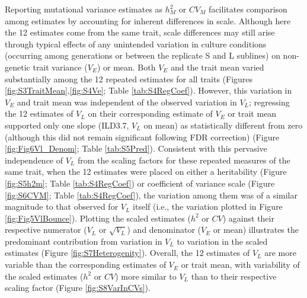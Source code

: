 Reporting mutational variance estimates as $h_M^2$ or $CV_M$ facilitates comparison among estimates by accounting for inherent differences in scale. Although here the 12 estimates come from the same trait, scale differences may still arise through typical effects of any unintended variation in culture conditions (occurring among generations or between the replicate S and L sublines) on non-genetic trait variance ($V_E$) or mean. Both $V_E$ and the trait mean varied substantially among the 12 repeated estimates for all traits (Figures \ref{fig:S3TraitMean},\ref{fig:S4Ve}; Table \ref{tab:S4RegCoef}). However, this variation in $V_E$ and trait mean was independent of the observed variation in $V_L$; regressing the 12 estimates of $V_L$ on their corresponding estimate of $V_E$ or trait mean supported only one slope (ILD3.7, $V_L$ on mean) as statistically different from zero (although this did not remain significant following FDR correction) (Figure \ref{fig:Fig6Vl_Denom}; Table \ref{tab:S5Pred}). Consistent with this pervasive independence of $V_L$ from the scaling factors for these repeated measures of the same trait, when the 12 estimates were placed on either a heritability (Figure \ref{fig:S5h2m}; Table \ref{tab:S4RegCoef}) or coefficient of variance scale (Figure \ref{fig:S6CVM}; Table \ref{tab:S4RegCoef}), the variation among them was of a similar magnitude to that observed for $V_L$ itself (i.e., the variation plotted in Figure \ref{fig:Fig5VlBounce}). Plotting the scaled estimates ($h^2$ or $CV$) against their respective numerator ($V_L$ or $\sqrt{V_L}$) and denominator ($V_E$ or mean) illustrates the predominant contribution from variation in $V_L$ to variation in the scaled estimates (Figure \ref{fig:S7Heterogenity}). Overall, the 12 estimates of $V_L$ are more variable than the corresponding estimates of $V_E$ or trait mean, with variability of the scaled estimates ($h^2$ or $CV$) more similar to $V_L$ than to their respective scaling factor (Figure \ref{fig:S8VarInCVs}). \par


